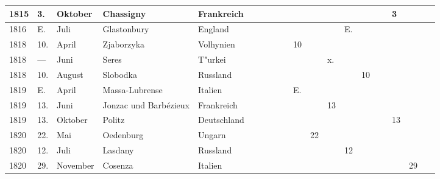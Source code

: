 \documentclass[a4paper, 8pt, oneside, polutonikogreek, german]{article}
\begin{document}
\begin{landscape}
\begin{table}[H]
\begin{longtable}{|p{5mm}|p{4mm}|p{13mm}|p{17mm}|p{17mm}|p{4mm}|p{6mm}|p{6mm}|p{6mm}|p{4mm}|p{5mm}|p{4mm}|p{5mm}|p{6mm}|p{5mm}|p{5mm}|p{5mm}|}
        1815 & 3. & Oktober & Chassigny & Frankreich & ~ & ~ & ~ & ~ & ~ & ~ & ~ & ~ & ~ & 3 & ~ & ~ \\ \hline
        1816 & E. & Juli & Glastonbury & England & ~ & ~ & ~ & ~ & ~ & ~ & E. & ~ & ~ & ~ & ~ & ~ \\ \hline
        1818 & 10. & April & Zjaborzyka & Volhynien & ~ & ~ & ~ & 10 & ~ & ~ & ~ & ~ & ~ & ~ & ~ & ~ \\ \hline
        1818 & --- & Juni & Seres & T"urkei & ~ & ~ & ~ & ~ & ~ & x. & ~ & ~ & ~ & ~ & ~ & ~ \\ \hline
        1818 & 10. & August & Slobodka & Russland & ~ & ~ & ~ & ~ & ~ & ~ & ~ & 10 & ~ & ~ & ~ & ~ \\ \hline
        1819 & E. & April & Massa-Lubrense & Italien & ~ & ~ & ~ & E. & ~ & ~ & ~ & ~ & ~ & ~ & ~ & ~ \\ \hline
        1819 & 13. & Juni & Jonzac und Barbézieux & Frankreich & ~ & ~ & ~ & ~ & ~ & 13 & ~ & ~ & ~ & ~ & ~ & ~ \\ \hline
        1819 & 13. & Oktober & Politz & Deutschland & ~ & ~ & ~ & ~ & ~ & ~ & ~ & ~ & ~ & 13 & ~ & ~ \\ \hline
        1820 & 22. & Mai & Oedenburg & Ungarn & ~ & ~ & ~ & ~ & 22 & ~ & ~ & ~ & ~ & ~ & ~ & ~ \\ \hline
        1820 & 12. & Juli & Lasdany & Russland & ~ & ~ & ~ & ~ & ~ & ~ & 12 & ~ & ~ & ~ & ~ & ~ \\ \hline
        1820 & 29. & November & Cosenza & Italien & ~ & ~ & ~ & ~ & ~ & ~ & ~ & ~ & ~ & ~ & 29 & ~ \\ \hline
    \end{longtable}
\end{table}
\end{landscape}
\clearpage
\end{document}
